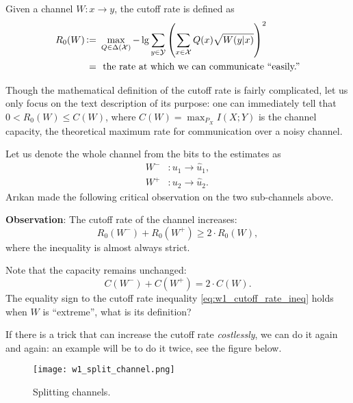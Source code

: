 \newpage %

\begin{definition}
    Given a channel $W:x\rightarrow y$, the cutoff rate is defined as
    \begin{equation}\begin{aligned}
        R_0(W) \operatorname{\vcentcolon=}&~ \max_{Q\in\Delta(\mathcal{X})}-\lg \sum_{y\in\mathcal{Y}}\left(\sum_{x\in\mathcal{X}}Q(x)\sqrt{W(y\vert x)}\right)^2 \\
        =&~\text{ the rate at which we can communicate ``easily.''}
    \end{aligned}\end{equation}
\end{definition}
Though the mathematical definition of the cutoff rate is fairly complicated, let us only focus on the text description of its purpose: one can immediately tell that $0 < R_0(W) \le C(W)$, where $C(W)=\max_{P_X}I(X;Y)$ is the channel capacity, the theoretical maximum rate for communication over a noisy channel.

Let us denote the whole channel from the bits to the estimates as
\begin{equation}\begin{aligned}
    W^{-} &: u_1 \rightarrow \hat{u}_1, \\
    W^{+} &: u_2 \rightarrow \hat{u}_2.
\end{aligned}\end{equation}
Ar{\i}kan made the following critical observation on the two sub-channels above.

\textbf{Observation}: The cutoff rate of the channel increases:
\begin{equation}
    R_0(W^{-}) + R_0(W^{+}) \ge 2\cdot R_0(W), \label{eq:w1_cutoff_rate_ineq}
\end{equation}
where the inequality is almost always strict.

\begin{remark}
    Note that the capacity remains unchanged:
    \begin{equation}
        C(W^{-}) + C(W^{+}) = 2\cdot C(W).
    \end{equation}
    The equality sign to the cutoff rate inequality \autoref{eq:w1_cutoff_rate_ineq} holds when $W$ is ``extreme'', what is its definition?
\end{remark}

If there is a trick that can increase the cutoff rate \textit{costlessly}, we can do it again and again: an example will be to do it twice, see the figure below.
\begin{figure}[H]
    \centering
    \texttt{[image: w1\_split\_channel.png]}
    \caption{Splitting channels.}
\end{figure}

